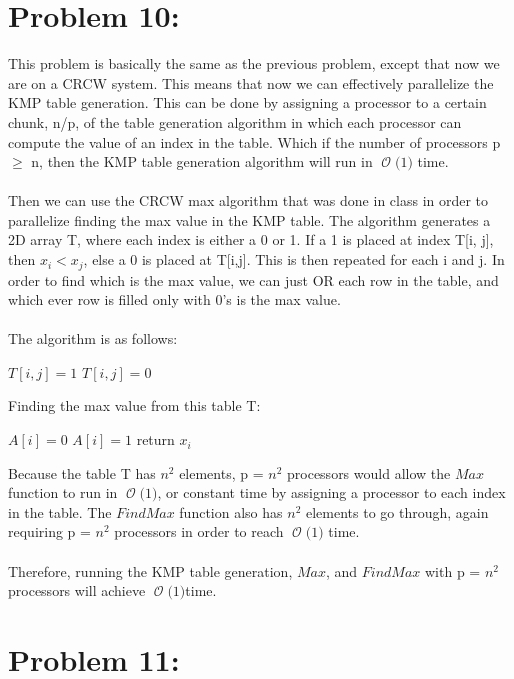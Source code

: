 \documentclass[12pt]{article}
\newcommand{\BigO}[1]{\ensuremath{\operatorname{\mathcal{O}}\bigl(#1\bigr)}}
\begin{document}
\section*{Problem 10: }
This problem is basically the same as the previous problem, except that now we are on a CRCW system. This means that now we can effectively parallelize the KMP table generation. This can be done by assigning a processor to a certain chunk, n/p, of the table generation algorithm in which each processor can compute the value of an index in the table. Which if the number of processors p {$\geq$} n, then the KMP table generation algorithm will run in \BigO{1} time.\\\\
Then we can use the CRCW max algorithm that was done in class in order to parallelize finding the max value in the KMP table. The algorithm generates a 2D array T, where each index is either a 0 or 1. If a 1 is placed at index T[i, j], then {$x_i < x_j$}, else a 0 is placed at T[i,j]. This is then repeated for each i and j. In order to find which is the max value, we can just OR each row in the table, and which ever row is filled only with 0's is the max value.\\\\
The algorithm is as follows:\\
\begin{algorithm}[H]
	{$T[i,j] = 1$}
\Else
	{$T[i,j] = 0$}
\end{algorithm}
Finding the max value from this table T:\\
\begin{algorithm}[H]
{$A[i] = 0$}
	{$A[i] = 1$}
	{return $x_i$}
\end{algorithm}
Because the table T has {$n^2$} elements, p = {$n^2$} processors would allow the {$Max$} function to run in \BigO{1}, or constant time by assigning a processor to each index in the table. The {$FindMax$} function also has {$n^2$} elements to go through, again requiring p = {$n^2$} processors in order to reach \BigO 1 time.\\\\
Therefore, running the KMP table generation, {$Max$}, and {$FindMax$} with p = {$n^2$} processors will achieve \BigO{1}time.
\section*{Problem 11: }
\end{document}
